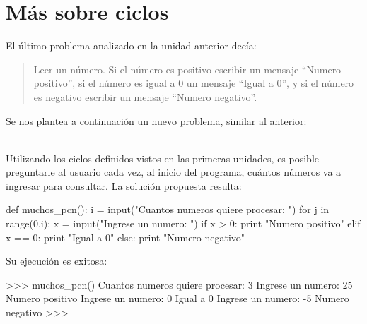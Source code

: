 
%

\chapter{Más sobre ciclos}

El último problema analizado en la unidad anterior decía:

\begin{quote}
Leer un número. Si el número es positivo escribir un mensaje
``Numero positivo'', si el número es igual a 0 un mensaje ``Igual a
0'', y si el número es negativo escribir un mensaje ``Numero
negativo''.
\end{quote}

Se nos plantea a continuación un nuevo problema, similar al anterior:

 \\

Utilizando los ciclos definidos vistos en las primeras unidades, es posible
preguntarle al usuario cada vez, al inicio del programa, cuántos números va a
ingresar para consultar. La solución propuesta resulta:

\begin{codigo-python}
def muchos_pcn():
    i = input("Cuantos numeros quiere procesar: ")
    for j in range(0,i):
        x = input("Ingrese un numero: ")
        if x > 0:
            print "Numero positivo"
        elif x == 0:
            print "Igual a 0"
        else:
            print "Numero negativo"
\end{codigo-python}

Su ejecución es exitosa:

\begin{codigo-python-sn}
>>> muchos_pcn()
Cuantos numeros quiere procesar: 3
Ingrese un numero: 25
Numero positivo
Ingrese un numero: 0
Igual a 0
Ingrese un numero: -5
Numero negativo
>>>
\end{codigo-python-sn}


